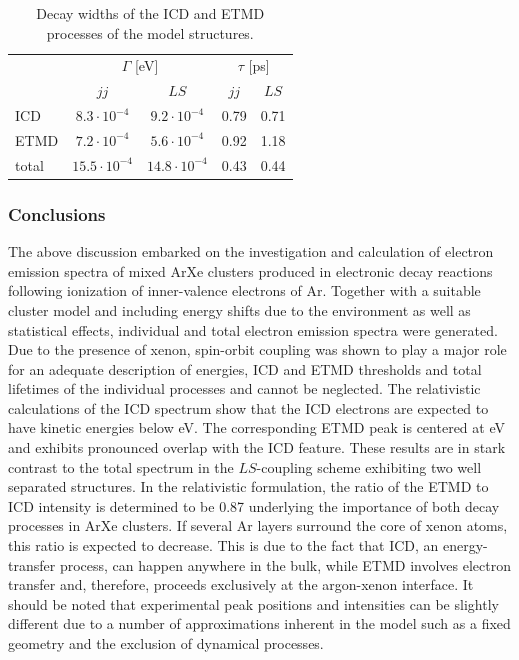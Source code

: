 \begin{table}[bt]
 \centering
 \caption{Decay widths of the ICD and ETMD processes of the model structures.}
 \begin{tabular}{lcccc}
  \toprule
          & \multicolumn{2}{c}{$\Gamma$ [eV]} & \multicolumn{2}{c}{$\tau$ [ps]}\\
          & $jj$               & $LS$               & $jj$ & $LS$ \\
  \midrule
   ICD    & $8.3\cdot 10^{-4}$ & $9.2\cdot 10^{-4}$ & 0.79 & 0.71\\
   ETMD   & $7.2\cdot 10^{-4}$ & $5.6\cdot 10^{-4}$ & 0.92 & 1.18\\
   total  & $15.5\cdot 10^{-4}$& $14.8\cdot 10^{-4}$& 0.43 & 0.44\\
  \bottomrule
 \end{tabular}
 \label{table:arxe_widths_model}
\end{table}

\subsubsection{Conclusions}
The above discussion embarked on the investigation and calculation of electron
emission spectra of mixed ArXe clusters produced in electronic decay reactions
following ionization of inner-valence electrons of Ar.
Together with a suitable cluster model and including
energy shifts due to the environment as well as statistical effects,
individual and total electron emission spectra were generated. Due to the
presence of xenon, spin-orbit coupling was shown to play a major role for an
adequate description of energies, ICD and ETMD thresholds and total lifetimes
of the individual processes and cannot be neglected. The  relativistic
calculations of the ICD spectrum show that the ICD electrons are expected to
have kinetic energies below \unit[2]{eV}. The corresponding ETMD peak is
centered at \unit[2]{eV} and exhibits pronounced overlap with the ICD feature.
These results are in stark contrast to the total spectrum in the
$LS$-coupling scheme
exhibiting two well separated structures. In the relativistic formulation,
the ratio of the ETMD to ICD intensity is determined to be 0.87 underlying the
importance of both decay processes in ArXe clusters.
If several Ar layers surround the core of xenon atoms,
this ratio is expected to decrease.
This is due to the fact that ICD, an energy-transfer process, can happen
anywhere in the bulk, while ETMD involves electron transfer and, therefore,
proceeds exclusively at the argon-xenon interface. It should be noted that
experimental peak positions and intensities can be slightly different due to
a number of approximations inherent in the model such as a fixed geometry and
the exclusion of dynamical processes.

